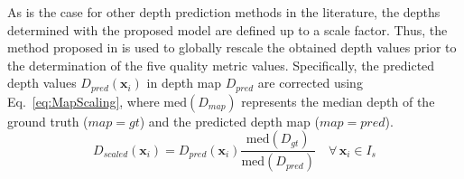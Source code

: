 \documentclass[a4paper,fleqn]{cas-dc}
\begin{document}
As is the case for other depth prediction methods in the literature, the depths determined with the proposed model are defined up to a scale factor. 
Thus, the method proposed in \citep{Godard_ICCV_2019} is used to globally rescale the obtained depth values prior to the determination of the five quality metric values. Specifically, the predicted depth values \( D_{pred}(\mathbf{x}_i) \) in depth map \( D_{pred} \) are corrected using Eq.~\eqref{eq:MapScaling}, where \( \textrm{med}(D_{map}) \) represents the median depth of the ground truth (\( map = gt \)) and the predicted depth map (\( map = pred \)).
%
\begin{equation} \label{eq:MapScaling}
    D_{scaled}(\mathbf{x}_i) = D_{pred}(\mathbf{x}_i) \frac{\textrm{med}(D_{gt})} {\textrm{med}(D_{pred})} \quad \forall \, \mathbf{x}_i \in I_s
\end{equation}
%
\end{document}
